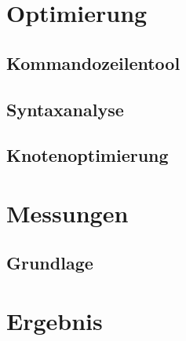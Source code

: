 \documentclass[11pt]{scrartcl}
\begin{document}
\pagebreak
\section{Optimierung}
\subsection{Kommandozeilentool}
\subsection{Syntaxanalyse}
\subsection{Knotenoptimierung}
\subsubsection{}

\pagebreak
\section{Messungen}
\subsection{Grundlage}
\fancyhead[R]{}

\pagebreak
\section{Ergebnis}

\thispagestyle{empty}

\renewcommand*{\biburlprefix}{(URL: }
\renewcommand*{\biburlsuffix}{)}

\pagebreak
{} %


\appendix

\end{document}
